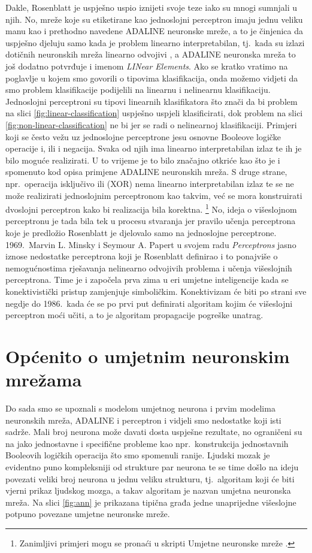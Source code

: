 \documentclass[times, utf8, zavrsni]{fer}
\begin{document}
\bigskip

Dakle, Rosenblatt je uspješno uspio iznijeti svoje teze iako su mnogi sumnjali u njih. No, mreže koje su etiketirane kao jednoslojni perceptron imaju jednu veliku manu kao i prethodno navedene ADALINE neuronske mreže, a to je činjenica da uspješno djeluju samo kada je problem linearno interpretabilan, tj.\ kada su izlazi dotičnih neuronskih mreža linearno odvojivi , a ADALINE neuronska mreža to još dodatno potvrđuje i imenom \textit{LINear Elements}. Ako se kratko vratimo na poglavlje u kojem smo govorili o tipovima klasifikacija, onda možemo vidjeti da smo problem klasifikacije podijelili na linearnu i nelinearnu klasifikaciju. Jednoslojni perceptroni su tipovi linearnih klasifikatora što znači da bi problem na slici \ref{fig:linear-classification} uspješno uspjeli klasificirati, dok problem na slici \ref{fig:non-linear-classification} ne bi jer se radi o nelinearnoj klasifikaciji. Primjeri koji se često vežu uz jednoslojne perceptrone jesu osnovne Booleove logičke operacije i, ili i negacija. Svaka od njih ima linearno interpretabilan izlaz te ih je bilo moguće realizirati. U to vrijeme je to bilo značajno otkriće kao što je i spomenuto kod opisa primjene ADALINE neuronskih mreža. S druge strane, npr.\ operacija isključivo ili (XOR) nema linearno interpretabilan izlaz te se ne može realizirati jednoslojnim perceptronom kao takvim, već se mora konstruirati dvoslojni perceptron kako bi realizacija bila korektna. \footnote{Zanimljivi primjeri mogu se pronaći u skripti Umjetne neuronske mreže \citep{cupicANN}.} No, ideja o višeslojnom perceptronu je tada bila tek u procesu stvaranja jer pravilo učenja perceptrona koje je predložio Rosenblatt je djelovalo samo na jednoslojne perceptrone. 1969.\ Marvin L. Minsky i Seymour A. Papert u svojem radu \textit{Perceptrons} jasno iznose nedostatke perceptrona koji je Rosenblatt definirao i to ponajviše o nemogućnostima rješavanja nelinearno odvojivih problema i učenja višeslojnih perceptrona. Time je i započela prva zima u eri umjetne inteligencije  kada se konektivistički pristup zamjenjuje simboličkim. Konektivizam će biti po strani sve negdje do 1986.\ kada će se po prvi put definirati algoritam kojim će višeslojni perceptron moći učiti, a to je algoritam propagacije pogreške unatrag.

\section{Općenito o umjetnim neuronskim mrežama}
Do sada smo se upoznali s modelom umjetnog neurona i prvim modelima neuronskih mreža, ADALINE i perceptron i vidjeli smo nedostatke koji isti sadrže. Mali broj neurona može davati dosta uspješne rezultate, no ograničeni su na jako jednostavne i  specifične probleme kao npr.\ konstrukcija jednostavnih Booleovih logičkih operacija što smo spomenuli ranije. Ljudski mozak je evidentno puno kompleksniji od strukture par neurona te se time došlo na ideju povezati veliki broj neurona u jednu veliku strukturu, tj.\ algoritam koji će biti vjerni prikaz ljudskog mozga, a takav algoritam je nazvan umjetna neuronska mreža. Na slici \ref{fig:ann} je prikazana tipična građa jedne unaprijedne višeslojne potpuno povezane umjetne neuronske mreže.
\end{document}
